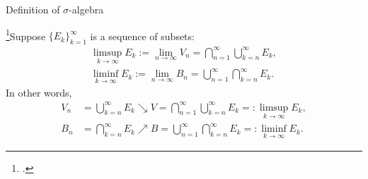 \documentclass[UTF8,a4paper,10pt]{article}
\begin{document}
  \begin{mybox}{Definition of \(\sigma\)-algebra}

    
    \footcite[][49]{Wheeden_Zygmund_2015}Suppose \(\{E_k\}_{k=1}^{\infty}\) is a sequence of subsets:
    \begin{equation*}
      \begin{aligned}
        \limsup_{k\to\infty}E_k := \lim_{n\to\infty} V_n = \bigcap_{n=1}^{\infty}  \bigcup_{k=n}^{\infty} E_k,\\
        \liminf_{k\to\infty}E_k := \lim_{n\to\infty} B_n = \bigcup_{n=1}^{\infty}  \bigcap_{k=n}^{\infty} E_k.
      \end{aligned}
    \end{equation*}
    In other words,
    \begin{equation*}
      \begin{aligned}
         V_n &= \bigcup_{k=n}^{\infty} E_k\searrow V= \bigcap_{n=1}^{\infty}  \bigcup_{k=n}^{\infty} E_k =: \limsup_{k\to\infty}E_k, \\
         B_n &= \bigcap_{k=n}^{\infty} E_k \nearrow B =  \bigcup_{n=1}^{\infty}  \bigcap_{k=n}^{\infty} E_k=:  \liminf_{k\to\infty}E_k.
      \end{aligned}
    \end{equation*}
    
    
  
  \end{mybox}
\end{document}
